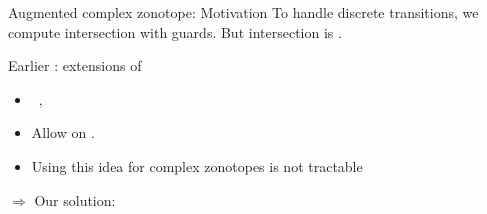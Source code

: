 \begin{frame}{Augmented complex zonotope: Motivation}
%
To handle discrete transitions, we compute intersection with guards.  But intersection is .\\[1.5em]
%
\begin{minipage}{1\textwidth}
{ Earlier : extensions of  

\begin{itemize}
\item {}~\cite{scott2016constrained}, ~\cite{Ghorbal2010}\\[0.5em]
\item Allow  on .
\item Using this idea for complex zonotopes is not tractable
\end{itemize}
%
}
\end{minipage}
\emph{}
%
\vspace{1em}



$\Rightarrow$ Our solution: 

%
%
%
\end{frame}


